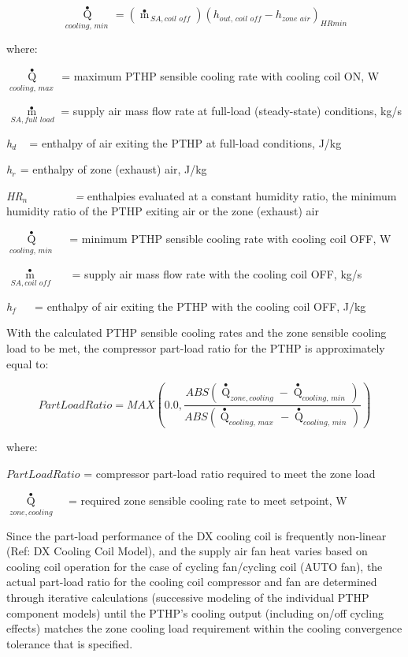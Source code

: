 \begin{equation}
{\mathop Q\limits^ \bullet_{cooling,\,min\,}} = \left( {{{\mathop m\limits^ \bullet  }_{\,SA,coil\,\,off}}} \right){\left( {{h_{out,\,coil\,\,off}} - {h_{zone\,\,air}}} \right)_{HRmin}}
\end{equation}

where:

\({\mathop Q\limits^ \bullet_{cooling,\,max\,}}\) = maximum PTHP sensible cooling rate with cooling coil ON, W

\({\mathop m\limits^ \bullet_{\,SA,full\,\,load}}\) = supply air mass flow rate at full-load (steady-state) conditions, kg/s

\emph{h\(_{d}\)} ~ = enthalpy of air exiting the PTHP at full-load conditions, J/kg

\emph{h\(_{r}\)}\(_{ }\) = enthalpy of zone (exhaust) air, J/kg

\emph{HR\(_{n}\)~~~~~~ ~ =} enthalpies evaluated at a constant humidity ratio, the minimum humidity ratio of the PTHP exiting air or the zone (exhaust) air

\({\mathop Q\limits^ \bullet_{cooling,\,min\,}}\) ~ = minimum PTHP sensible cooling rate with cooling coil OFF, W

\({\mathop m\limits^ \bullet_{\,SA,coil\,\,off}}\) ~~ = supply air mass flow rate with the cooling coil OFF, kg/s

\emph{h\(_{f}\)}~ ~ = enthalpy of air exiting the PTHP with the cooling coil OFF, J/kg

With the calculated PTHP sensible cooling rates and the zone sensible cooling load to be met, the compressor part-load ratio for the PTHP is approximately equal to:

\begin{equation}
PartLoadRatio = MAX\left( {0.0,\frac{{ABS\left( {{{\mathop Q\limits^ \bullet  }_{zone,cooling}} - {{\mathop Q\limits^ \bullet  }_{cooling,\,min\,}}} \right)}}{{ABS\left( {{{\mathop Q\limits^ \bullet  }_{cooling,\,max\,}} - {{\mathop Q\limits^ \bullet  }_{cooling,\,min\,}}} \right)}}} \right)
\end{equation}

where:

\(PartLoadRatio\) = compressor part-load ratio required to meet the zone load

\({\mathop Q\limits^ \bullet_{zone,cooling}}\) ~ = required zone sensible cooling rate to meet setpoint, W

Since the part-load performance of the DX cooling coil is frequently non-linear (Ref: DX Cooling Coil Model), and the supply air fan heat varies based on cooling coil operation for the case of cycling fan/cycling coil (AUTO fan), the actual part-load ratio for the cooling coil compressor and fan are determined through iterative calculations (successive modeling of the individual PTHP component models) until the PTHP's cooling output (including on/off cycling effects) matches the zone cooling load requirement within the cooling convergence tolerance that is specified.

